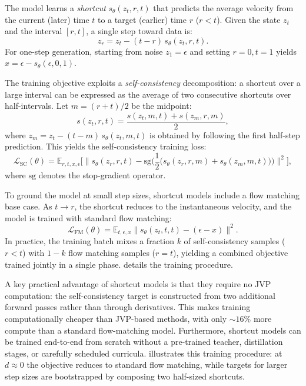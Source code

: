The model learns a \emph{shortcut} $s_\theta(z_t, r, t)$ that predicts the average velocity from the current (later) time $t$ to a target (earlier) time $r$ ($r < t$). Given the state $z_t$ and the interval $[r, t]$, a single step toward data is:
\begin{equation}
    z_r = z_t - (t - r) \, s_\theta(z_t, r, t).
\end{equation}
For one-step generation, starting from noise $z_1 = \epsilon$ and setting $r=0, t=1$ yields $x = \epsilon - s_\theta(\epsilon, 0, 1)$.

The training objective exploits a \emph{self-consistency} decomposition: a shortcut over a large interval can be expressed as the average of two consecutive shortcuts over half-intervals. Let $m = (r + t)/2$ be the midpoint:
\begin{equation}
    s(z_t, r, t) = \frac{s(z_t, m, t) + s(z_m, r, m)}{2},
    \label{eq:sc-self-consistency}
\end{equation}
where $z_m = z_t - (t - m) \, s_\theta(z_t, m, t)$ is obtained by following the first half-step prediction. This yields the self-consistency training loss:
\begin{equation}
    \mathcal{L}_{\text{SC}}(\theta) = \mathbb{E}_{r,t,x,\epsilon} \Big[ \big\| s_\theta(z_r, r, t) - \text{sg}\Big( \frac{1}{2} \big( s_\theta(z_r, r, m) + s_\theta(z_m, m, t) \big) \Big) \big\|^2 \Big],
    \label{eq:sc-loss}
\end{equation}
where $\text{sg}$ denotes the stop-gradient operator.

To ground the model at small step sizes, shortcut models include a flow matching base case. As $t \to r$, the shortcut reduces to the instantaneous velocity, and the model is trained with standard flow matching:
\begin{equation}
    \mathcal{L}_{\text{FM}}(\theta) = \mathbb{E}_{t, \epsilon, x} \big\| s_\theta(z_t, t, t) - (\epsilon - x) \big\|^2.
\end{equation}
In practice, the training batch mixes a fraction $k$ of self-consistency samples ($r < t$) with $1 - k$ flow matching samples ($r = t$), yielding a combined objective trained jointly in a single phase.  details the training procedure.



A key practical advantage of shortcut models is that they require no JVP computation: the self-consistency target is constructed from two additional forward passes rather than through derivatives. This makes training computationally cheaper than JVP-based methods, with only $\sim 16\%$ more compute than a standard flow-matching model. Furthermore, shortcut models can be trained end-to-end from scratch without a pre-trained teacher, distillation stages, or carefully scheduled curricula.  illustrates this training procedure: at $d \approx 0$ the objective reduces to standard flow matching, while targets for larger step sizes are bootstrapped by composing two half-sized shortcuts.

